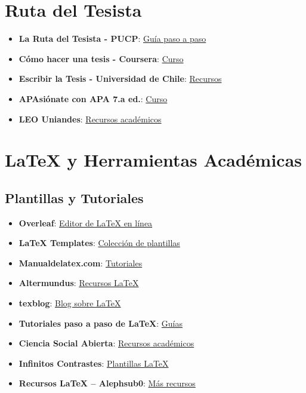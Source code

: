 \documentclass[
  jou,
  floatsintext,
  longtable,
  a4paper,
  nolmodern,
  notxfonts,
  notimes,
  colorlinks=true,linkcolor=blue,citecolor=blue,urlcolor=blue]{apa7}
\providecommand{\tightlist}{%
  \setlength{\itemsep}{0pt}\setlength{\parskip}{0pt}}
\begin{document}
\section{Ruta del Tesista}\label{ruta-del-tesista}

\begin{itemize}
\tightlist
\item
  \textbf{La Ruta del Tesista - PUCP}:
  \href{https://posgrado.pucp.edu.pe/informacion-para-estudiantes/la-ruta-del-tesista/}{Guía
  paso a paso}
\item
  \textbf{Cómo hacer una tesis - Coursera}:
  \href{https://www.coursera.org/learn/como-hacer-una-tesis}{Curso}
\item
  \textbf{Escribir la Tesis - Universidad de Chile}:
  \href{https://aprendizaje.uchile.cl/recursos-para-leer-escribir-y-hablar-en-la-universidad/escribir-la-tesis/}{Recursos}
\item
  \textbf{APAsiónate con APA 7.a ed.}:
  \href{https://centrodeescriturajaveriano.thinkific.com/courses/normas-apa-septima-edicion}{Curso}
\item
  \textbf{LEO Uniandes}: \href{https://leo.uniandes.edu.co/}{Recursos
  académicos}
\end{itemize}

\section{LaTeX y Herramientas
Académicas}\label{latex-y-herramientas-acaduxe9micas}

\subsection{Plantillas y Tutoriales}\label{plantillas-y-tutoriales}

\begin{itemize}
\tightlist
\item
  \textbf{Overleaf}: \href{https://www.overleaf.com/}{Editor de LaTeX en
  línea}
\item
  \textbf{LaTeX Templates}:
  \href{http://www.latextemplates.com/}{Colección de plantillas}
\item
  \textbf{Manualdelatex.com}:
  \href{https://manualdelatex.com/tutoriales}{Tutoriales}
\item
  \textbf{Altermundus}: \href{https://altermundus.fr/}{Recursos LaTeX}
\item
  \textbf{texblog}: \href{https://texblog.org/about/}{Blog sobre LaTeX}
\item
  \textbf{Tutoriales paso a paso de LaTeX}:
  \href{https://manualdelatex.com/tutoriales}{Guías}
\item
  \textbf{Ciencia Social Abierta}:
  \href{https://cienciasocialabierta.netlify.app/}{Recursos académicos}
\item
  \textbf{Infinitos Contrastes}:
  \href{https://imalexissaez.github.io/2021/09/01/algunas-plantillas-de-latex-interesantes/}{Plantillas
  LaTeX}
\item
  \textbf{Recursos LaTeX -- Alephsub0}:
  \href{https://alephsub0.org/recursos/}{Más recursos}
\end{itemize}
\end{document}
